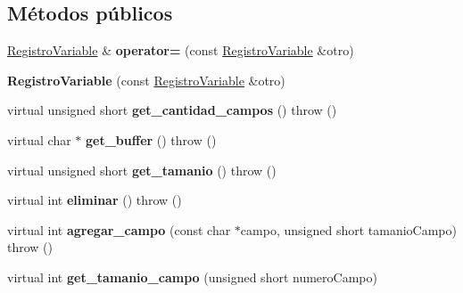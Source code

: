 \subsection*{\-Métodos públicos}
\begin{DoxyCompactItemize}
\item 
\hypertarget{class_registro_variable_a4e7eb7d77a9efca223b2312d590c5e59}{\hyperlink{class_registro_variable}{\-Registro\-Variable} \& {\bfseries operator=} (const \hyperlink{class_registro_variable}{\-Registro\-Variable} \&otro)}\label{class_registro_variable_a4e7eb7d77a9efca223b2312d590c5e59}

\item 
\hypertarget{class_registro_variable_ac69c34033706fd87c6174b3b22f267fe}{{\bfseries \-Registro\-Variable} (const \hyperlink{class_registro_variable}{\-Registro\-Variable} \&otro)}\label{class_registro_variable_ac69c34033706fd87c6174b3b22f267fe}

\item 
\hypertarget{class_registro_variable_aeb6622516c2d8add2d627c3c7630d6c4}{virtual unsigned short {\bfseries get\-\_\-cantidad\-\_\-campos} ()  throw ()}\label{class_registro_variable_aeb6622516c2d8add2d627c3c7630d6c4}

\item 
\hypertarget{class_registro_variable_ac7c813dde777fd79f2a5b54c26c369e3}{virtual char $\ast$ {\bfseries get\-\_\-buffer} ()  throw ()}\label{class_registro_variable_ac7c813dde777fd79f2a5b54c26c369e3}

\item 
\hypertarget{class_registro_variable_a7e0e01d2d381c60d79ca58cd7ebc5fac}{virtual unsigned short {\bfseries get\-\_\-tamanio} ()  throw ()}\label{class_registro_variable_a7e0e01d2d381c60d79ca58cd7ebc5fac}

\item 
\hypertarget{class_registro_variable_a26fc6f157ee0cb86db3c2f2d204903d4}{virtual int {\bfseries eliminar} ()  throw ()}\label{class_registro_variable_a26fc6f157ee0cb86db3c2f2d204903d4}

\item 
\hypertarget{class_registro_variable_a3d330efb0451562663472811ad0cd86d}{virtual int {\bfseries agregar\-\_\-campo} (const char $\ast$campo, unsigned short tamanio\-Campo)  throw ()}\label{class_registro_variable_a3d330efb0451562663472811ad0cd86d}

\item 
\hypertarget{class_registro_variable_a93276063439ad5a36cff88e0398693f6}{virtual int {\bfseries get\-\_\-tamanio\-\_\-campo} (unsigned short numero\-Campo)}\label{class_registro_variable_a93276063439ad5a36cff88e0398693f6}


\end{DoxyCompactItemize}
